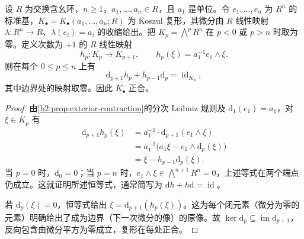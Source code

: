 \begin{proposition}\label{b2:prop:koszul-unit-contractible}
	设 \(R\) 为交换含幺环，\(n\ge1\)，\(a_1,\ldots,a_n\in R\)，且 \(a_1\) 是单位。令 \(e_1,\ldots,e_n\) 为 \(R^n\) 的标准基，\(K_\bullet=K_\bullet(a_1,\ldots,a_n;R)\) 为 Koszul 复形，其微分由 \(R\) 线性映射 \(\lambda:R^n\rightarrow R\)、\(\lambda(e_i)=a_i\) 的收缩给出。把 \(K_p=\bigwedge^pR^n\) 在 \(p<0\) 或 \(p>n\) 时取为零。定义次数为 \(+1\) 的 \(R\) 线性映射
	\[
		h_p:K_p\longrightarrow K_{p+1}, \qquad h_p(\xi)=a_1^{-1}e_1\wedge\xi.
	\]
	则在每个 \(0\le p\le n\) 上有
	\[
		\mathrm{d}_{p+1}h_p+h_{p-1}\mathrm{d}_p=\operatorname{id}_{K_p},
	\]
	其中边界处的映射取零。因此 \(K_\bullet\) 正合。
\end{proposition}
\begin{proof}
	由\cref{b2:prop:exterior-contraction}的分次 Leibniz 规则及 \(\mathrm{d}_1(e_1)=a_1\)，对 \(\xi\in K_p\) 有
	\[
		\begin{aligned}
			\mathrm{d}_{p+1}h_p(\xi) &=a_1^{-1}\cdot\mathrm{d}_{p+1}(e_1\wedge\xi)\\
			&=a_1^{-1}\bigl(a_1\xi-e_1\wedge\mathrm{d}_p(\xi)\bigr)\\
			&=\xi-h_{p-1}\mathrm{d}_p(\xi).
		\end{aligned}
	\]
	当 \(p=0\) 时，\(\mathrm{d}_0=0\)；当 \(p=n\) 时，\(e_1\wedge\xi\in\bigwedge^{n+1}R^n=0\)，上述等式在两个端点仍成立。这就证明所述恒等式，通常简写为 \(\mathrm{d}h+h\mathrm{d}=\operatorname{id}\)。

	若 \(\mathrm{d}_p(\xi)=0\)，恒等式给出 \(\xi=\mathrm{d}_{p+1}(h_p(\xi))\)。这为每个闭元素（微分为零的元素）明确给出了成为边界（下一次微分的像）的原像。故 \(\ker\mathrm{d}_p\subseteq\operatorname{im}\mathrm{d}_{p+1}\)，反向包含由微分平方为零成立，复形在每处正合。
\end{proof}
